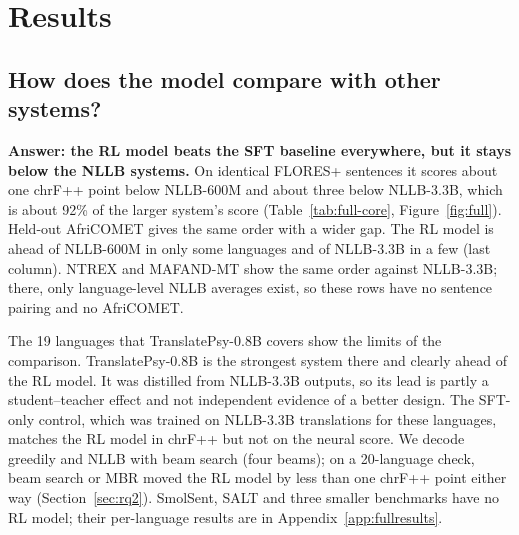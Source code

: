 \section{Results}\label{sec:results}

\subsection{How does the model compare with other systems?}\label{sec:compare}
\textbf{Answer: the RL model beats the SFT baseline everywhere, but it stays below the NLLB systems.} On identical FLORES+ sentences it scores about one chrF++ point below NLLB-600M and about three below NLLB-3.3B, which is about 92\% of the larger system's score (Table~\ref{tab:full-core}, Figure~\ref{fig:full}). Held-out AfriCOMET gives the same order with a wider gap. The RL model is ahead of NLLB-600M in only some languages and of NLLB-3.3B in a few (last column). NTREX and MAFAND-MT show the same order against NLLB-3.3B; there, only language-level NLLB averages exist, so these rows have no sentence pairing and no AfriCOMET.

The 19 languages that TranslatePsy-0.8B covers show the limits of the comparison. TranslatePsy-0.8B is the strongest system there and clearly ahead of the RL model. It was distilled from NLLB-3.3B outputs, so its lead is partly a student--teacher effect and not independent evidence of a better design. The SFT-only control, which was trained on NLLB-3.3B translations for these languages, matches the RL model in chrF++ but not on the neural score. We decode greedily and NLLB with beam search (four beams); on a 20-language check, beam search or MBR moved the RL model by less than one chrF++ point either way (Section~\ref{sec:rq2}). SmolSent, SALT and three smaller benchmarks have no RL model; their per-language results are in Appendix~\ref{app:fullresults}.

